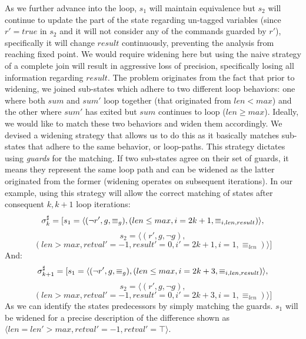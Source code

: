As we further advance into the loop, $s_1$ will maintain equivalence but $s_2$ will continue to update the part of the state regarding un-tagged variables  (since $r'=true$ in $s_2$ and it will not consider any of the commands guarded by $r'$), specifically it will change $result$ continuously, preventing the analysis from reaching fixed point. We would require widening here but using the naive strategy of a complete join will result in aggressive loss of precision, specifically losing all information regarding $result$. The problem originates from the fact that prior to widening, we joined sub-states which adhere to two different loop behaviors: one where both $sum$ and $sum'$ loop together (that originated from $len < max$) and the other where $sum'$ has exited but $sum$ continues to loop ($len \geq max$). Ideally, we would like to match these two behaviors and widen them accordingly. We devised a widening strategy that allows us to do this as it basically matches sub-states that adhere to the same behavior, or loop-paths. This strategy dictates using \emph{guards} for the matching. If two sub-states agree on their set of guards, it means they represent the same loop path and can be widened as the latter originated from the former (widening operates on subsequent iterations). In our example, using this strategy will allow the correct matching of states after consequent $k, k+1$ loop iterations:
\[
\sigma^\sharp_{k} = [ s_1 = \langle (\neg r',g,\equiv_{g}),(len \leq max, i = 2k + 1, \equiv_{i,len,result}) \rangle,
\]
\[
s_2 = \langle (r',g,\neg g),
\]
\[
(len > max, retval' = -1, result' = 0, i' = 2k + 1, i = 1, \equiv_{len}) \rangle ]
\]
And:
\[
\sigma^\sharp_{k+1} = [ s_1 = \langle (\neg r',g,\equiv_{g}),(len \leq max, i = 2k + 3, \equiv_{i,len,result}) \rangle,
\]
\[
s_2 = \langle (r',g,\neg g),
\]
\[
(len > max, retval' = -1, result' = 0, i' = 2k + 3, i = 1, \equiv_{len}) \rangle ]
\]
As we can identify the states predecessors by simply matching the guards. $s_1$ will be widened for a precise description of the difference shown as $\langle len = len' > max, retval' = -1, retval' = \top \rangle$.

